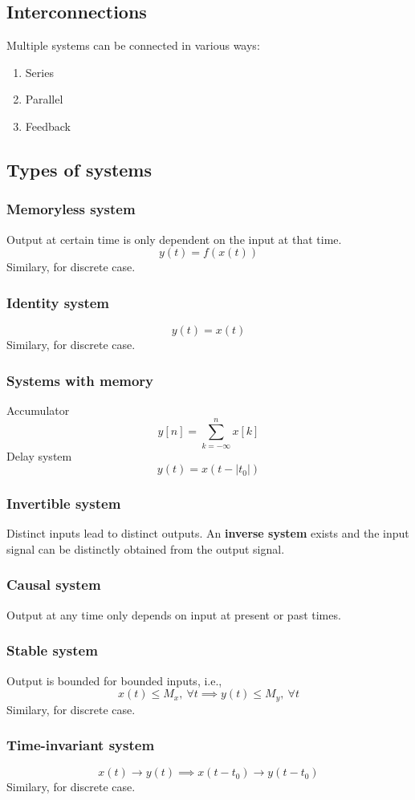 \documentclass[10pt, a4paper]{extarticle}
\theoremstyle{definition}
\begin{document}
	  \subsection{Interconnections}
	  Multiple systems can be connected in various ways:
	  \begin{enumerate}
		  \item Series
			\item Parallel
			\item Feedback
  \end{enumerate}
  \subsection{Types of systems}
  \subsubsection{Memoryless system}
  Output at certain time is only dependent on the input at that time.
  \[y(t)=f(x(t))\]
	Similary, for discrete case.
  \subsubsection{Identity system}
  \[y(t)=x(t)\]
	Similary, for discrete case.
  \subsubsection{Systems with memory}
  Accumulator\[y[n]=\sum_{k=-\infty}^nx[k]\]
  Delay system \[y(t)=x(t-|t_0|)\]
  \subsubsection{Invertible system}
  Distinct inputs lead to distinct outputs. An \textbf{inverse system} exists and the input signal can be distinctly obtained from the output signal.
  \subsubsection{Causal system}
  Output at any time only depends on input at present or past times.
  \subsubsection{Stable system}
  Output is bounded for bounded inputs, i.e.,\[x(t)\leq M_x,\ \forall t\implies y(t)\leq M_y,\ \forall t\]
	Similary, for discrete case.
  \subsubsection{Time-invariant system}
  \[x(t)\to y(t)\implies x(t-t_0)\to y(t-t_0)\]
	Similary, for discrete case.
\end{document}
